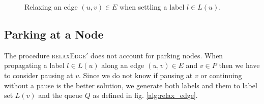 \begin{figure}[hbtp]
	\setlength{\interspacetitleruled}{0pt}%
	\setlength{\algotitleheightrule}{0pt}%
	\begin{algorithm*}[H]
		\DontPrintSemicolon



	\end{algorithm*}
	\setlength{\interspacetitleruled}{2pt}%
	\setlength{\algotitleheightrule}{\algotitleheightruledefault}%

	\caption{\label{alg:relax_edge_no_p}Relaxing an edge $(u,v) \in E$ when settling a label $l \in L(u)$.}
\end{figure}

\subsection{Parking at a Node}
The procedure \textsc{relaxEdge$'$} does not account for parking nodes. When propagating a label $l \in L(u)$ along an edge $(u,v) \in E$ and $v \in P$ then we have to consider pausing at $v$. Since we do not know if pausing at $v$ or continuing without a pause is the better solution, we generate both labels and them to label set $L(v)$ and the queue $Q$ as defined in fig. \ref{alg:relax_edge}.

